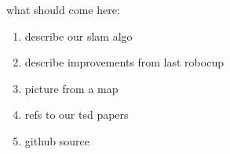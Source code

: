 
what should come here:
\begin{enumerate}
	\item describe our slam algo
	\item describe improvements from last robocup
	\item picture from a map
	\item refs to our tsd papers
	\item github source
\end{enumerate}
